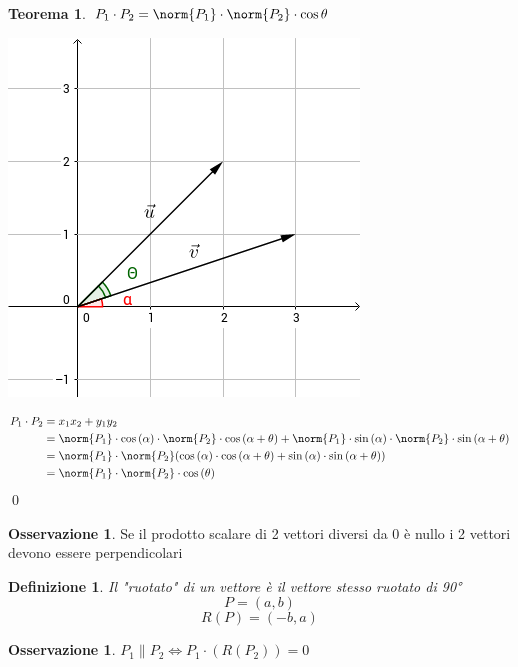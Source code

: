 \documentclass[10pt,a4paper]{article}
\theoremstyle{plain}
\newtheorem{definizione}[subsection]{Definizione}
\theoremstyle{definition}
\newtheorem{teorema}[subsection]{Teorema}
\newtheorem{osservazione}[subsection]{Osservazione}
\begin{document}
	\begin{teorema} $P_1 \cdot P_2 = \norm{P_1} \cdot \norm{P_2} \cdot \cos{\theta}$
	
	\includegraphics[scale=0.5]{graph.png}
	
	\begin{align*}
		P_1\cdot P_2 &= x_1 x_2 + y_1 y_2 \\
		&=\norm{P_1}\cdot \cos{(\alpha)} \cdot \norm{P_2} \cdot \cos{(\alpha + \theta)} + \norm{P_1}\cdot \sin{(\alpha)} \cdot  \norm{P_2} \cdot \sin{(\alpha + \theta)} \\
		&=\norm{P_1}\cdot \norm{P_2}(\cos{(\alpha)} \cdot \cos{(\alpha + \theta)} + \sin{(\alpha)} \cdot \sin{(\alpha + \theta)}) \\
		& = \norm{P_1} \cdot \norm{P_2} \cdot \cos{(\theta)} \\
	\end{align*}
	\qed	
	\end{teorema}
	
	\begin{osservazione} 
		Se il prodotto scalare di 2 vettori diversi da 0 è nullo i 2 vettori devono essere perpendicolari
	\end{osservazione}
	
	\begin{definizione} Il "ruotato" di un vettore è il vettore stesso ruotato di 90°
		\[P=(a,b)\]
		\[R(P)=(-b,a)\]
	\end{definizione}
	\begin{osservazione}
		$P_1 \parallel P_2 \Leftrightarrow P_1 \cdot (R(P_2))=0$
	\end{osservazione}
\end{document}

